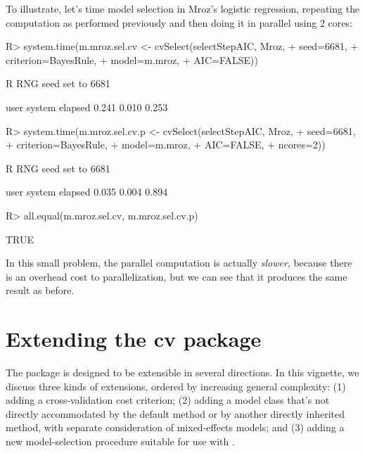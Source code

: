 \documentclass[
]{jss}
\begin{document}
To illustrate, let's time model selection in Mroz's logistic regression,
repeating the computation as performed previously and then doing it in
parallel using 2 cores:

\begin{CodeChunk}
\begin{CodeInput}
R> system.time(m.mroz.sel.cv <- cvSelect(selectStepAIC, Mroz,
+                           seed=6681,
+                           criterion=BayesRule,
+                           model=m.mroz,
+                           AIC=FALSE))
\end{CodeInput}
\begin{CodeOutput}
R RNG seed set to 6681
\end{CodeOutput}
\begin{CodeOutput}
   user  system elapsed 
  0.241   0.010   0.253 
\end{CodeOutput}
\begin{CodeInput}
R> system.time(m.mroz.sel.cv.p <- cvSelect(selectStepAIC, Mroz,
+                           seed=6681,
+                           criterion=BayesRule,
+                           model=m.mroz,
+                           AIC=FALSE,
+                           ncores=2))
\end{CodeInput}
\begin{CodeOutput}
R RNG seed set to 6681
\end{CodeOutput}
\begin{CodeOutput}
   user  system elapsed 
  0.035   0.004   0.894 
\end{CodeOutput}
\begin{CodeInput}
R> all.equal(m.mroz.sel.cv, m.mroz.sel.cv.p)
\end{CodeInput}
\begin{CodeOutput}
[1] TRUE
\end{CodeOutput}
\end{CodeChunk}

In this small problem, the parallel computation is actually
\emph{slower}, because there is an overhead cost to parallelization, but
we can see that it produces the same result as before.

\hypertarget{extending-the-cv-package}{%
\section{Extending the cv package}\label{extending-the-cv-package}}

The  package is designed to be extensible in several directions.
In this vignette, we discuss three kinds of extensions, ordered by
increasing general complexity: (1) adding a cross-validation cost
criterion; (2) adding a model class that's not directly accommodated by
the  default method or by another directly inherited method,
with separate consideration of mixed-effects models; and (3) adding a
new model-selection procedure suitable for use with
.
\end{document}
